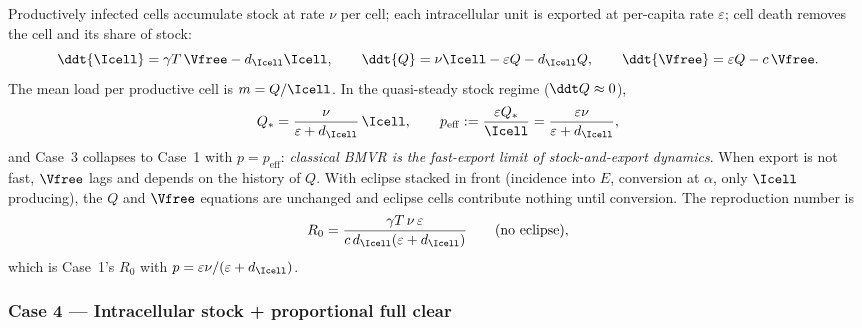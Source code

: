 Productively infected cells accumulate stock at rate $\nu$ per cell; each
intracellular unit is exported at per-capita rate $\varepsilon$; cell death
removes the cell and its share of stock:
\begin{equation}
\ddt{\Icell}=\gamma T\,\Vfree-d_{\Icell}\Icell,
\qquad
\ddt{Q}=\nu\Icell-\varepsilon Q-d_{\Icell}Q,
\qquad
\ddt{\Vfree}=\varepsilon Q-c\,\Vfree.
\end{equation}
The mean load per productive cell is $m=Q/\Icell$. In the quasi-steady
stock regime ($\ddt Q\approx0$),
\begin{equation}
Q_*=\frac{\nu}{\varepsilon+d_{\Icell}}\,\Icell,
\qquad
p_{\mathrm{eff}}:=\frac{\varepsilon Q_*}{\Icell}
=\frac{\varepsilon\nu}{\varepsilon+d_{\Icell}},
\end{equation}
and Case~3 collapses to Case~1 with $p=p_{\mathrm{eff}}$: \emph{classical
BMVR is the fast-export limit of stock-and-export dynamics}. When export is
not fast, $\Vfree$ lags and depends on the history of $Q$. With eclipse
stacked in front (incidence into $E$, conversion at $\alpha$, only $\Icell$
producing), the $Q$ and $\Vfree$ equations are unchanged and eclipse cells
contribute nothing until conversion. The reproduction number is
\begin{equation}
R_0=\frac{\gamma T\,\nu\,\varepsilon}{c\,d_{\Icell}(\varepsilon+d_{\Icell})}
\qquad\text{(no eclipse)},
\end{equation}
which is Case~1's $R_0$ with $p=\varepsilon\nu/(\varepsilon+d_{\Icell})$.

\subsubsection{Case 4 --- Intracellular stock + proportional full clear}

